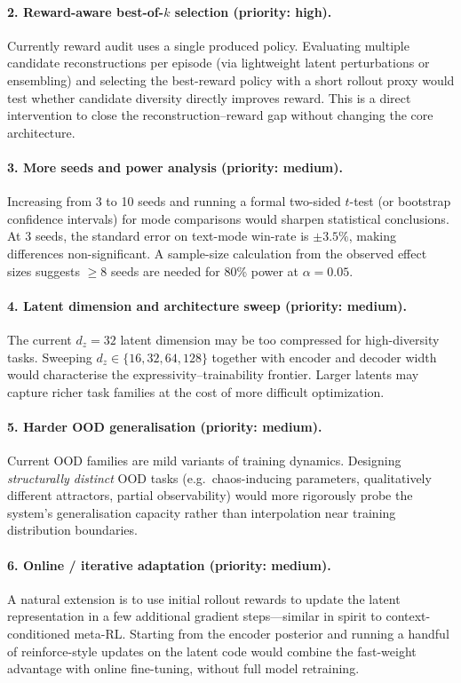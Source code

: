 \paragraph{2. Reward-aware best-of-$k$ selection (priority: high).}
Currently reward audit uses a single produced policy.
Evaluating multiple candidate reconstructions per episode (via lightweight latent perturbations or ensembling) and selecting the best-reward policy with a short rollout proxy would test whether candidate diversity directly improves reward.
This is a direct intervention to close the reconstruction--reward gap without changing the core architecture.

\paragraph{3. More seeds and power analysis (priority: medium).}
Increasing from 3 to 10 seeds and running a formal two-sided $t$-test (or bootstrap confidence intervals) for mode comparisons would sharpen statistical conclusions.
At 3 seeds, the standard error on text-mode win-rate is $\pm3.5\%$, making differences non-significant.
A sample-size calculation from the observed effect sizes suggests $\geq$8 seeds are needed for 80\% power at $\alpha = 0.05$.

\paragraph{4. Latent dimension and architecture sweep (priority: medium).}
The current $d_z = 32$ latent dimension may be too compressed for high-diversity tasks.
Sweeping $d_z \in \{16, 32, 64, 128\}$ together with encoder and decoder width would characterise the expressivity--trainability frontier.
Larger latents may capture richer task families at the cost of more difficult optimization.

\paragraph{5. Harder OOD generalisation (priority: medium).}
Current OOD families are mild variants of training dynamics.
Designing \emph{structurally distinct} OOD tasks (e.g.\ chaos-inducing parameters, qualitatively different attractors, partial observability) would more rigorously probe the system's generalisation capacity rather than interpolation near training distribution boundaries.

\paragraph{6. Online / iterative adaptation (priority: medium).}
A natural extension is to use initial rollout rewards to update the latent representation in a few additional gradient steps---similar in spirit to context-conditioned meta-RL.
Starting from the encoder posterior and running a handful of reinforce-style updates on the latent code would combine the fast-weight advantage with online fine-tuning, without full model retraining.

